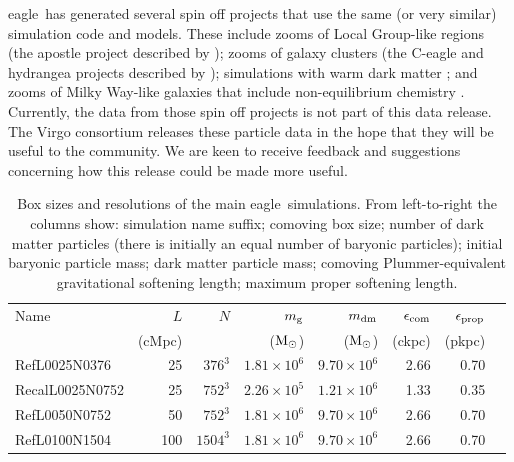 \documentclass[10pt, a4paper]{article}
\newcommand{\eagle}{{\sc eagle}}
\newcommand{\Msun}{{\hbox{${\rm M}_\odot$}}}
\begin{document}
\eagle\ has generated several spin off projects that use the same (or very
similar) simulation code and models. These include zooms of Local Group-like
regions (the {\sc apostle project} described by \cite{sawala2016,fattahi2016});
zooms of galaxy clusters (the {\sc C-eagle} and {\sc hydrangea} projects
described by \cite{bahe2017, barnes2017}); simulations with warm dark matter
\cite{lovell2016}; and zooms of Milky Way-like galaxies that include
non-equilibrium chemistry \cite{oppenheimer2016}. Currently, the data from
those spin off projects is not part of this data release. The {\sc Virgo}
consortium releases these particle data in the hope that they will be useful to
the community. We are keen to receive feedback and suggestions concerning how
this release could be made more useful.

\begin{table}
\caption{Box sizes and resolutions of the main \eagle\ simulations.  From
left-to-right the columns show: simulation name suffix; comoving box size;
number of dark matter particles (there is initially an equal number of baryonic
particles); initial baryonic particle mass; dark matter particle mass;
comoving Plummer-equivalent gravitational softening length; maximum proper
softening length.} 
\label{table:sims}
 \begin{center}
\begin{tabular}{lrrrrrrr}
\hline
Name & $L$ & $N$ & $m_{\rm g}$ & $m_{\rm dm}$ &
$\epsilon_{\rm com}$ & $\epsilon_{\rm prop}$ \\  
& (cMpc) & & ($\Msun$) & ($\Msun$) & (ckpc) & (pkpc)\\
\hline 
{\sc Ref}L0025N0376 &  25 & $376^3$ & $1.81\times 10^6$ & $9.70\times 10^6$ & 2.66 &0.70\\
{\sc Recal}L0025N0752 &  25 & $752^3$ & $2.26\times 10^5$ & $1.21\times 10^6$ & 1.33 & 0.35\\
{\sc Ref}L0050N0752 &  50 & $752^3$ & $1.81\times 10^6$ & $9.70\times 10^6$ & 2.66 &0.70\\
{\sc Ref}L0100N1504 & 100 & $1504^3$ & $1.81\times 10^6$ & $9.70\times 10^6$ & 2.66 &0.70\\
\hline
\end{tabular}
\end{center}
\end{table}
\end{document}
